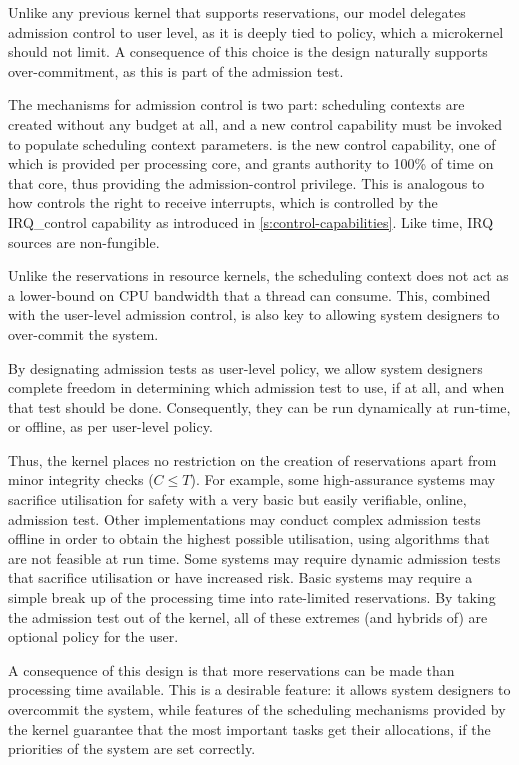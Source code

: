 Unlike any previous kernel that supports reservations, our model delegates admission control to user
level, as it is deeply tied to policy, which a microkernel should not limit. A consequence of this
choice is the design naturally supports over-commitment, as this is part of the admission test.

The mechanisms for admission control is two part: scheduling contexts are created without
any budget at all, and a new control capability must be invoked to populate scheduling context
parameters.
\schedcontrol is the new control capability, one of which is provided per processing core,
and grants authority to 100\% of time on that core, thus providing the admission-control privilege.
This is analogous to how \selfour controls the right
to receive interrupts, which is controlled by the IRQ\_control
capability as introduced in \cref{s:control-capabilities}. Like time, IRQ sources are non-fungible.

Unlike the reservations in resource kernels, the scheduling context does not 
act as a lower-bound on CPU bandwidth that a thread can consume. This, combined with the
user-level admission control, is also key to allowing system designers to over-commit the system. 

By designating admission tests as user-level policy, we allow system designers complete freedom
in determining which admission test to use, if at all, and when that test should be done.
Consequently, they can be run dynamically at run-time, or offline, as per user-level policy.

Thus, the kernel places no restriction on the creation of reservations apart from minor integrity
checks (\ie $C \leq T$).
For example, some high-assurance systems may sacrifice utilisation for safety with a very basic but easily verifiable, online, admission test.
Other implementations may conduct complex admission tests offline in order to obtain the highest possible utilisation, using algorithms that are not feasible at run time.
Some systems may require dynamic admission tests that sacrifice utilisation or have increased risk.
Basic systems may require a simple break up of the processing time into rate-limited reservations.
By taking the admission test out of the kernel, all of these extremes (and hybrids of) are optional policy for the user.

A consequence of this design is that more reservations can be made than processing time available.
This is a desirable feature: it allows system designers to overcommit the system, while features of the scheduling mechanisms provided by the kernel guarantee that the most important tasks get their allocations, if the priorities of the system are set correctly.

